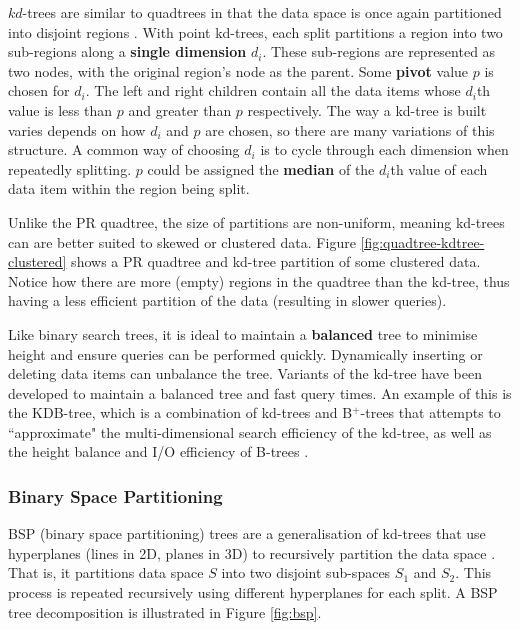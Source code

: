 $kd$-trees are similar to quadtrees in that the data space is once again partitioned into disjoint regions \cite{kd-tree}. With point kd-trees, each split partitions a region into two sub-regions along a \textbf{single dimension} $d_i$. These sub-regions are represented as two nodes, with the original region's node as the parent. Some \textbf{pivot} value $p$ is chosen for $d_i$. The left and right children contain all the data items whose $d_i$th value is less than $p$ and greater than $p$ respectively. The way a kd-tree is built varies depends on how $d_i$ and $p$ are chosen, so there are many variations of this structure. A common way of choosing $d_i$ is to cycle through each dimension when repeatedly splitting. $p$ could be assigned the \textbf{median} of the $d_i$th value of each data item within the region being split.

Unlike the PR quadtree, the size of partitions are non-uniform, meaning kd-trees can are better suited to skewed or clustered data. Figure \ref{fig:quadtree-kdtree-clustered} shows a PR quadtree and kd-tree partition of some clustered data. Notice how there are more (empty) regions in the quadtree than the kd-tree, thus having a less efficient partition of the data (resulting in slower queries).

Like binary search trees, it is ideal to maintain a \textbf{balanced} tree to minimise height and ensure queries can be performed quickly. Dynamically inserting or deleting data items can unbalance the tree. Variants of the kd-tree have been developed to maintain a balanced tree and fast query times. An example of this is the KDB-tree, which is a combination of kd-trees and B${}^{+}$-trees that attempts to ``approximate" the multi-dimensional search efficiency of the kd-tree, as well as the height balance and I/O efficiency of B-trees \cite{kdb-tree}.

\subsubsection{Binary Space Partitioning}

BSP (binary space partitioning) trees are a generalisation of kd-trees that use hyperplanes (lines in 2D, planes in 3D) to recursively partition the data space \cite{bsp-tree}. That is, it partitions data space $S$ into two disjoint sub-spaces $S_1$ and $S_2$. This process is repeated recursively using different hyperplanes for each split. A BSP tree decomposition is illustrated in Figure \ref{fig:bsp}.

